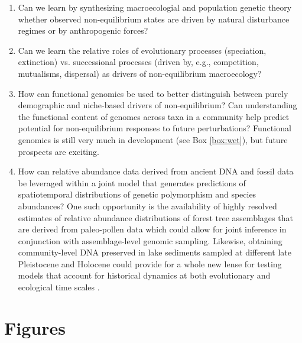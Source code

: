 \documentclass[12pt]{article}
\newcounter{Box}
\begin{document}
\begin{enumerate}
\item Can we learn by synthesizing macroecologial and population
  genetic theory whether observed non-equilibrium states are driven by
  natural disturbance regimes or by anthropogenic forces? 
\item Can we learn the relative roles of evolutionary processes
  (speciation, extinction) vs. successional processes (driven by,
  e.g., competition, mutualisms, dispersal) as drivers of
  non-equilibrium macroecology?
\item How can functional genomics be used to better distinguish
  between purely demographic and niche-based drivers of
  non-equilibrium? Can understanding the functional content of genomes
  across taxa in a community help predict potential for
  non-equilibrium responses to future perturbations? Functional
  genomics is still very much in development (see Box \ref{box:wet}),
  but future prospects are exciting.
\item How can relative abundance data derived from ancient DNA and
  fossil data be leveraged within a joint model that generates
  predictions of spatiotemporal distributions of genetic polymorphism
  and species abundances? One such opportunity is the availability of
  highly resolved estimates of relative abundance distributions of
  forest tree assemblages that are derived from paleo-pollen data
  \citep{dawson2016} which could allow for joint inference in
  conjunction with assemblage-level genomic sampling. Likewise,
  obtaining community-level DNA preserved in lake sediments sampled at
  different late Pleistocene and Holocene could provide for a whole
  new lense for testing models that account for historical dynamics at
  both evolutionary and ecological time scales \citep{capo2016}.
\end{enumerate}

\pagebreak

\section*{Figures}
\end{document}
